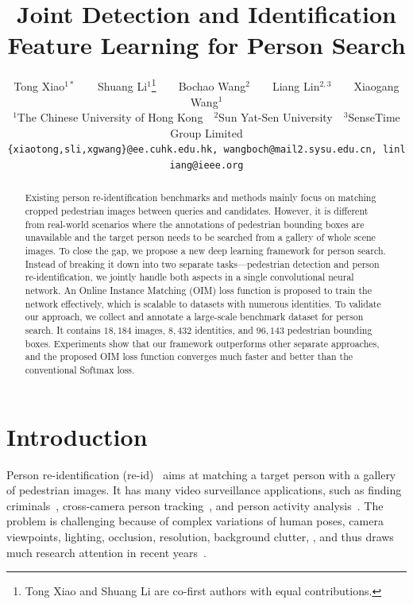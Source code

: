 \documentclass[10pt,twocolumn,letterpaper]{article}
\begin{document}
\title{Joint Detection and Identification Feature Learning for Person Search}

\author{Tong Xiao$^{1*}$\ \ \ \ Shuang Li$^{1}$\thanks{Tong Xiao and Shuang Li are co-first authors with equal contributions.}\ \ \ \ Bochao Wang$^{2}$\ \ \ \ Liang Lin$^{2,3}$\ \ \ \ Xiaogang Wang$^{1}$\\
\small $^{1}$The Chinese University of Hong Kong~~\small $^{2}$Sun Yat-Sen University~~\small $^{3}$SenseTime Group Limited\\
{\tt\small \{xiaotong,sli,xgwang\}@ee.cuhk.edu.hk,\ wangboch@mail2.sysu.edu.cn,\ linliang@ieee.org}
}

\maketitle
\thispagestyle{empty}

\begin{abstract}
Existing person re-identification benchmarks and methods mainly focus on matching cropped pedestrian images between queries and candidates. However, it is different from real-world scenarios where the annotations of pedestrian bounding boxes are unavailable and the target person needs to be searched from a gallery of whole scene images. To close the gap, we propose a new deep learning framework for person search. Instead of breaking it down into two separate tasks---pedestrian detection and person re-identification, we jointly handle both aspects in a single convolutional neural network. An Online Instance Matching (OIM) loss function is proposed to train the network effectively, which is scalable to datasets with numerous identities. To validate our approach, we collect and annotate a large-scale benchmark dataset for person search. It contains $18,184$ images, $8,432$ identities, and $96,143$ pedestrian bounding boxes. Experiments show that our framework outperforms other separate approaches, and the proposed OIM loss function converges much faster and better than the conventional Softmax loss.
\end{abstract}

\section{Introduction} %
\label{sec:introduction}
Person re-identification (re-id)~\cite{zajdel2005keeping,gheissari2006person} aims at matching a target person with a gallery of pedestrian images. It has many video surveillance applications, such as finding criminals~\cite{wang2013intelligent}, cross-camera person tracking~\cite{yu2013harry}, and person activity analysis~\cite{loy2009multi}. The problem is challenging because of complex variations of human poses, camera viewpoints, lighting, occlusion, resolution, background clutter, \etc, and thus draws much research attention in recent years~\cite{zheng2015scalable,liao2015person,paisitkriangkrai2015learning,xiao2016learning,li2014deepreid,chu2016structured}.
\end{document}
